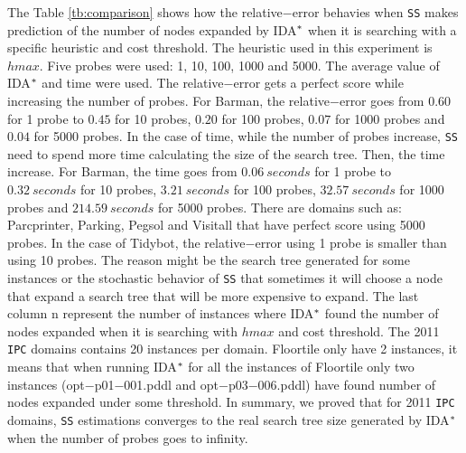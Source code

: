 The Table \ref{tb:comparison} shows how the relative$-$error behavies when \texttt{SS} makes prediction of the number of nodes expanded by IDA$\sp{*}$ when it is searching with a specific heuristic and cost threshold. The heuristic used in this experiment is $hmax$. Five probes were used: 1, 10, 100, 1000 and 5000. The average value of IDA$\sp{*}$ and time were used. The relative$-$error gets a perfect score while increasing the number of probes. For Barman, the relative$-$error goes from $0.60$ for 1 probe to $0.45$ for 10 probes, $0.20$ for 100 probes, $0.07$ for 1000 probes and $0.04$ for 5000 probes. In the case of time, while the number of probes increase, \texttt{SS} need to spend more time calculating the size of the search tree. Then, the time increase. For Barman, the time goes from $0.06\ seconds$ for 1 probe to $0.32\ seconds$ for 10 probes, $3.21\ seconds$ for 100 probes, $32.57\ seconds$ for 1000 probes and $214.59\ seconds$ for 5000 probes. There are domains such as: Parcprinter, Parking, Pegsol and Visitall that have perfect score using 5000 probes. In the case of Tidybot, the relative$-$error using 1 probe is smaller than using 10 probes. The reason might be the search tree generated for some instances or the stochastic behavior of \texttt{SS} that sometimes it will choose a node that expand a search tree that will be more expensive to expand. The last column \textsf{n} represent the number of instances where IDA$\sp{*}$ found the number of nodes expanded when it is searching with $hmax$ and cost threshold. The 2011 \texttt{IPC} domains contains 20 instances per domain. Floortile only have 2 instances, it means that when running IDA$\sp{*}$ for all the instances of Floortile only two instances (opt$-$p01$-$001.pddl and opt$-$p03$-$006.pddl) have found number of nodes expanded under some threshold. In summary, we proved that for 2011 \texttt{IPC} domains, \texttt{SS} estimations converges to the real search tree size generated by IDA$\sp{*}$ when the number of probes goes to infinity.

